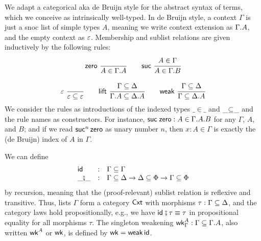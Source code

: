 \documentclass[sigplan,screen,fleqn,review]{acmart} %
\begin{document}
We adapt a categorical aka de Bruijn style for the abstract syntax of
terms, which we conceive as intrinsically well-typed.  In de Bruijn
style, a context $\Gamma$ is just a snoc list of simple types $A$,
meaning we write context extension as $\Gamma.A$, and the empty
context as $\varepsilon$.  Membership  and sublist
relations \fbox{$\Gamma \sublist \Delta$} are given inductively by the
following rules:
\begin{gather*}
  \nru{\tzero}{}{A \in \cext \Gamma A}
\qquad
  \nru{\tsuc}{A \in \Gamma}{A \in \cext \Gamma B}
\\[2ex]
  \nru{\tdone}{}{\cempty \sublist \cempty}
\qquad
  \nru{\tlift}
    {\Gamma \sublist \Delta}
    {\cext \Gamma A \sublist \cext \Delta A}
\qquad
  \nru{\tweak}
    {\Gamma \sublist \Delta}
    {\Gamma \sublist \cext \Delta A}
\end{gather*}
We consider the rules as introductions of the indexed types
$\_{\in}\_$ and $\_{\subseteq}\_$ and the rule names as constructors.
For instance, $\mathsf{\mathsf{suc}\;\mathsf{zero}} : A \in \Gamma.A.B$ for any
$\Gamma$, $A$, and $B$; and if we read $\mathsf{suc}^n\,\mathsf{zero}$ as unary
number $n$, then $x : A \in \Gamma$ is exactly the (de Bruijn) index
of $A$ in $\Gamma$.

We can define
\[
\begin{array}{lcl}
\mathsf{id} & : & \Gamma \subseteq \Gamma
\\
\_{\fatsemi}\_ & : & \Gamma
\subseteq \Delta \to \Delta \subseteq \Phi \to \Gamma \subseteq \Phi
\end{array}
\]
by recursion, meaning that the (proof-relevant)
sublist relation is reflexive and transitive.
Thus, lists $\Gamma$ form a category
$\mathsf{Cxt}$ with morphisms $\tau : \Gamma \subseteq \Delta$, and the category laws
hold propositionally, e.g., we have $\mathsf{id}_{} \fatsemi \tau \equiv \tau$ in
propositional equality for all morphisms $\tau$.
The singleton weakening $\mathsf{wk}^A_\Gamma : \Gamma \subseteq \Gamma.A$,
also written $\mathsf{wk}^A$ or $\mathsf{wk}$, is defined by $\mathsf{wk} = \mathsf{weak}\,\mathsf{id}$.
\end{document}

